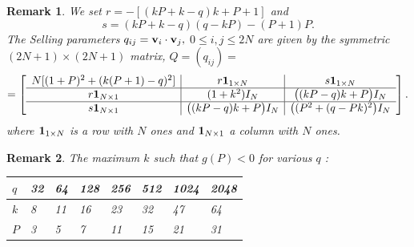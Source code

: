 \documentclass{amsart}
\newtheorem{remark}{Remark}[section]
\numberwithin{equation}{section}
\begin{document}
\begin{remark}
We set $r = - [(kP+k-q)k+P+1]$ and $$s=(kP+k-q)(q-kP)-(P+1)P.$$ 
The Selling parameters $q_{ij}={\bf v}_i\cdot {\bf v}_j,$ $0\le i,j\le 2N$ are given by the symmetric $(2N+1)\times (2N+1)$ matrix, $Q=(q_{ij})=$
$$=\left[\begin{array}{c|c|c}
N[(1+P)^2+(k(P+1)-q)^2] & r{\bf 1}_{1\times N}  & s{\bf 1}_{1\times N} \\
\hline
r{\bf 1}_{N\times 1}  & (1+k^2)I_N & \big((kP-q)k+P\big)I_N  \\
\hline
s{\bf 1}_{N\times 1} &  \big((kP-q)k+P\big)I_N & \big((P^2+(q-Pk)^2\big)I_N   \\
\end{array}\right].
$$
where ${\bf 1}_{1\times N}$ is a row with $N$ ones and ${\bf 1}_{N\times 1}$ a column with $N$ ones.

\end{remark}
\begin{remark}
The maximum $k$ such that $g(P)<0$ for various $q$ :

\begin{table}[h]

\begin{tabular}{|l||l|l|l|l|l|l|l|}
\hline 
$q$ & 32 & 64 & 128 & 256 & 512 & 1024 &2048\\ \hline
$k$ & 8 & 11 & 16 & 23 & 32 & 47 & 64 \\ \hline
$P$ & 3 & 5 & 7 & 11 & 15 & 21 & 31 \\  \hline
\end{tabular}
\label{Tab:1}
\end{table} 

\end{remark}
\end{document}
